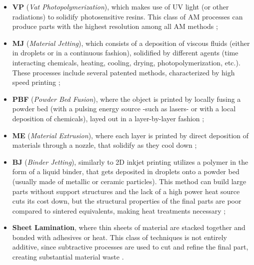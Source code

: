 \documentclass[a4paper]{article}
\begin{document}
    \begin{itemize}
        \item \textbf{VP} (\textit{Vat Photopolymerization}), which makes use of UV light (or other radiations) to solidify photosensitive resins. This class of AM processes can produce 
                        parts with the highest resolution among all AM methods \autocites*{Recent_progress_polymers_AM}{Kovalcik_PHA_Review};
        \item \textbf{MJ} (\textit{Material Jetting}), which consists of a deposition of viscous fluids (either in droplets or in a continuous fashion), solidified by different agents 
                            (time interacting chemicals, heating, cooling, drying, photopolymerization, etc.). These processes include several patented methods, characterized by 
                            high speed printing \autocite*{Recent_progress_polymers_AM};
        \item \textbf{PBF} (\textit{Powder Bed Fusion}), where the object is printed by locally fusing a powder bed (with a pulsing energy source -such as lasers- or with a local deposition of chemicals),
                            layed out in a layer-by-layer fashion \autocites*{Recent_progress_polymers_AM}{Kovalcik_PHA_Review};
        \item \textbf{ME} (\textit{Material Extrusion}), where each layer is printed by direct deposition of materials through a nozzle, that solidify as they cool down \autocites*{Recent_progress_polymers_AM}{Kovalcik_PHA_Review};
        \item \textbf{BJ} (\textit{Binder Jetting}), similarly to 2D inkjet printing utilizes a
                        polymer in the form of a liquid binder, that gets deposited in droplets onto a powder bed (usually made of metallic or ceramic particles). This 
                        method can build large parts without support structures and the lack of a high power heat source cuts its cost down, but the structural 
                        properties of the final parts are poor compared to sintered equivalents, making heat treatments necessary \autocite*{Recent_progress_polymers_AM};
        \item \textbf{Sheet Lamination}, where thin sheets of material are stacked together and bonded with adhesives or heat. This class of techniques 
                        is not entirely additive, since subtractive processes are used to cut and refine the final part, creating substantial material waste \autocite*{Recent_progress_polymers_AM}.
    \end{itemize} \clearpage
\end{document}
